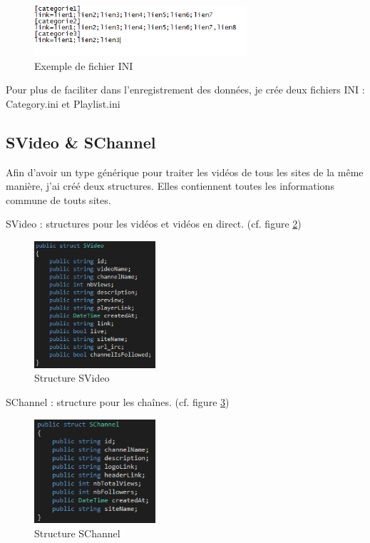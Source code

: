 \documentclass[11pt]{report} %
\begin{document}
		\begin{figure}[h]
			\center
			\includegraphics[width=0.7\textwidth]{../img/inifile.png}
			\caption{Exemple de fichier INI}
			\label{inifile}
		\end{figure}
		
		Pour plus de faciliter dans l'enregistrement des données, je crée deux fichiers INI : Category.ini et Playlist.ini
			
		\newpage
		
		\subsection{SVideo \& SChannel}
			Afin d'avoir un type générique pour traiter les vidéos de tous les sites de la même manière, j'ai créé deux structures. Elles contiennent toutes les informations commune de touts sites.
			
			SVideo : structures pour les vidéos et vidéos en direct. (cf. figure \ref{SVideo})
			
			\begin{figure}[h]
				\center
				\includegraphics[width=0.4\textwidth]{../img/SVideo.png}
				\caption{Structure SVideo}
				\label{SVideo}
			\end{figure}
			
			SChannel : structure pour les chaînes. (cf. figure \ref{SChanel})
			
			\begin{figure}[h]
				\center
				\includegraphics[width=0.4\textwidth]{../img/SChannel.png}
				\caption{Structure SChannel}
				\label{SChanel}
			\end{figure}
			
\end{document}
